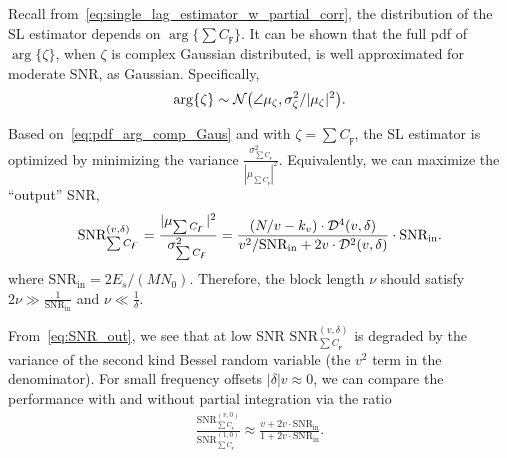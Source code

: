 Recall from~\eqref{eq:single_lag_estimator_w_partial_corr},
the distribution of the SL estimator depends on
$\arg\{\sum C_{\digamma} \}$.
It can be shown that the full pdf of $\arg\{\zeta\}$, when $\zeta$ is
complex Gaussian distributed, is well approximated for moderate SNR,
as Gaussian. 
Specifically,
\begin{equation}
  \label{eq:pdf_arg_comp_Gaus}
  \arg\{\zeta\} \sim \mathcal{N}\big(\angle \mu_{\zeta},\sigma^2_{\zeta}/|\mu_{\zeta}|^2\big).
\end{equation}

Based on~\eqref{eq:pdf_arg_comp_Gaus} and with
$\zeta = \sum C_{\digamma}$,
the SL estimator is optimized by minimizing the
variance $\frac{\sigma^2_{\sum C_{\digamma}}}{|\mu_{\sum C_{\digamma}}|^2}$.
Equivalently, we can maximize the ``output'' SNR, 
\begin{equation}
  \begin{aligned}
    \label{eq:SNR_out}
    \text{SNR}_{\sum C_{\digamma}}^{(v,\delta)}=\frac{|\mu_{\sum C_{\digamma}}|^2}{\sigma^2_{\sum C_{\digamma}}} 
    =\frac{(N/v-k_v)\cdot\mathcal{D}^4(v,\delta)}
    {v^2/\text{SNR}_{\text{in}}+2v\cdot\mathcal{D}^2(v,\delta)}\cdot\text{SNR}_{\text{in}}. \\
  \end{aligned}
\end{equation}
where $\text{SNR}_{\text{in}}=2E_s/(MN_0)$.
Therefore, the block length $\nu$ should satisfy $2\nu \gg
\frac{1}{\text{SNR}_{\text{in}}}$ and $\nu \ll \frac{1}{\delta}$.

From~\eqref{eq:SNR_out}, we 
see that  at low SNR $\text{SNR}_{\sum C_{\digamma}}^{(v,\delta)}$ is degraded by
the variance of the second kind Bessel random variable (the $v^2$ term
in the denominator).
For small frequency offsets  $|\delta|v \approx 0$,
we can compare the performance
with and without partial integration via the ratio
\begin{equation}
  \begin{aligned}
    \label{eq:relative_processing_gain}
    \frac{\text{SNR}_{\sum C_{\digamma}}^{(v,0)}}{\text{SNR}_{\sum C_{\digamma}}^{(1,0)}}
    \approx\frac{v+2v\cdot\text{SNR}_{\text{in}}}{1+2v\cdot\text{SNR}_{\text{in}}}.
  \end{aligned}
\end{equation}

